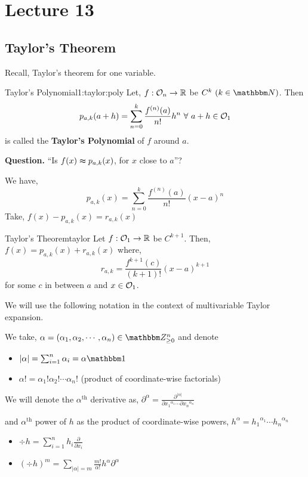 \documentclass[../Analysis-3]{subfiles}
\begin{document}
\chapter*{Lecture 13} %
\setcounter{chapter}{13} %
\setcounter{section}{0}

\section{Taylor's Theorem}
Recall, Taylor's theorem for one variable.
\begin{Def}{Taylor's Polynomial}{1:taylor:poly}
    Let, $ f : \mathcal{O}_{n} \to \mathbb{R} $ be $C^k \ (k \in \N)$. Then
    \[ p_{a,k}(a+h) = \sum_{n = 0}^{k} \frac{f^{(n)}(a)}{n!} h^{n} \ \forall\ a+h \in \mathcal{O}_{1} \]
    is called the \textbf{Taylor's Polynomial} of $f$ around $a$.
\end{Def}

\textbf{Question.} ``Is $f(x) \thickapprox  p_{a,k}(x)$, for $x$ close to $a$''?

We have,
\[  p_{a,k}(x) = \sum_{n = 0}^{k} \frac{f^{(n)}(a)}{n!} (x-a)^{n} \]
Take, $f(x) - p_{a,k}(x) = r_{a,k}(x)$

\begin{Thm}{Taylor's Theorem}{taylor}
    Let $ f: \mathcal{O}_{1} \to \mathbb{R} $ be $C^{k+1}$. Then, $f(x) = p_{a,k}(x) + r_{a,k}(x)$ where,
    \[r_{a,k} = \frac{f^{k+1}(c)}{(k+1)!} (x-a)^{k+1}\]
    for some $c$ in between $a$ and $x \in \mathcal{O}_{1}$.
\end{Thm}

We will use the following notation in the context of multivariable Taylor expansion.

\begin{notnBox}{}{}
    We take, $\alpha = (\alpha_1 , \alpha_2 , \cdots , \alpha_n) \in \Z_{\geq 0}^{n}$ and denote
    \begin{itemize}
        \item $|\alpha| = \sum_{i = 1}^{n} \alpha_i = \alpha\bb{1}$
        \item $\alpha ! = \alpha_1 ! \alpha_2 ! \cdots \alpha_n !$ (product of coordinate-wise factorials)
    \end{itemize}
    We will denote the $ \alpha^{\text{th}} $ derivative as, $\displaystyle\partial^{\alpha} = \frac{\partial^{|\alpha|}}{\partial {x_1}^{\alpha_1} \cdots \partial {x_n}^{\alpha_n}}$

    and $ \alpha^{\text{th}} $ power of $ h $ as the product of coordinate-wise powers, $h^{\alpha} = {h_1}^{\alpha_1} \cdots {h_n}^{\alpha_n}$
    \begin{itemize}
        \item $\displaystyle\div h = \sum_{i=1}^n h_i\frac{\partial}{\partial x_i}$
        \item $\displaystyle(\div h)^m = \sum_{| \alpha | = m } \frac{m!}{\alpha!} h^{\alpha} \partial^{\alpha}$
    \end{itemize}
\end{notnBox}
\end{document}
